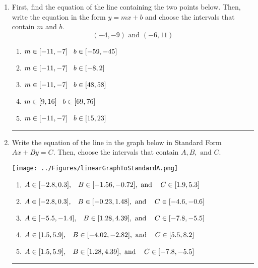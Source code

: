 \documentclass[14pt]{extbook}
\newcommand{\litem}[1]{\item#1\hspace*{-1cm}\rule{\textwidth}{0.4pt}}
\begin{document}
\begin{enumerate}
{\begin{enumerate}[label=\Alph*.]
\end{enumerate} }
\litem{
First, find the equation of the line containing the two points below. Then, write the equation in the form $ y=mx+b $ and choose the intervals that contain $m$ and $b$.\[ (-4, -9) \text{ and } (-6, 11) \]\begin{enumerate}[label=\Alph*.]
\item \( m \in [-11, -7] \hspace*{3mm} b \in [-59, -45] \)
\item \( m \in [-11, -7] \hspace*{3mm} b \in [-8, 2] \)
\item \( m \in [-11, -7] \hspace*{3mm} b \in [48, 58] \)
\item \( m \in [9, 16] \hspace*{3mm} b \in [69, 76] \)
\item \( m \in [-11, -7] \hspace*{3mm} b \in [15, 23] \)

\end{enumerate} }
\litem{
Write the equation of the line in the graph below in Standard Form $Ax+By=C$. Then, choose the intervals that contain $A, B, \text{ and } C$.
\begin{center}
    \texttt{[image: ../Figures/linearGraphToStandardA.png]}
\end{center}
\begin{enumerate}[label=\Alph*.]
\item \( A \in [-2.8, 0.3], \hspace{3mm} B \in [-1.56, -0.72], \text{ and } \hspace{3mm} C \in [1.9, 5.3] \)
\item \( A \in [-2.8, 0.3], \hspace{3mm} B \in [-0.23, 1.48], \text{ and } \hspace{3mm} C \in [-4.6, -0.6] \)
\item \( A \in [-5.5, -1.4], \hspace{3mm} B \in [1.28, 4.39], \text{ and } \hspace{3mm} C \in [-7.8, -5.5] \)
\item \( A \in [1.5, 5.9], \hspace{3mm} B \in [-4.02, -2.82], \text{ and } \hspace{3mm} C \in [5.5, 8.2] \)
\item \( A \in [1.5, 5.9], \hspace{3mm} B \in [1.28, 4.39], \text{ and } \hspace{3mm} C \in [-7.8, -5.5] \)


\end{enumerate}}
\end{enumerate}
\end{document}
